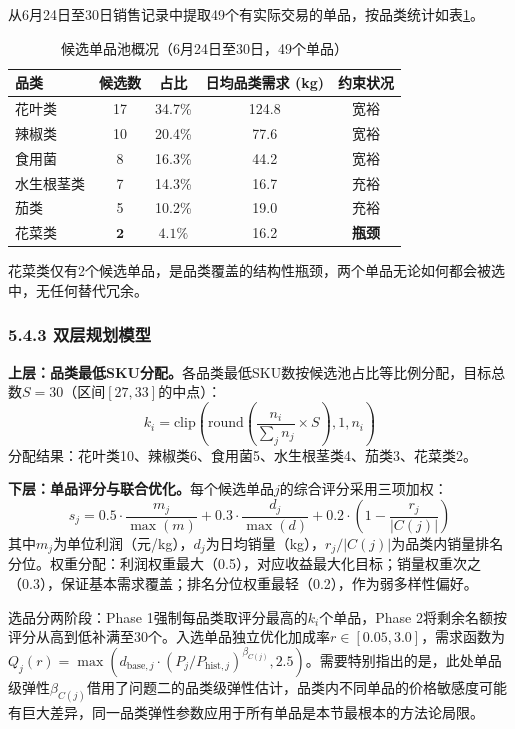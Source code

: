 \documentclass[12pt,a4paper]{article}
\begin{document}
从6月24日至30日销售记录中提取49个有实际交易的单品，按品类统计如表\ref{tab:q3_candidates}。

\begin{table}[H]
\centering
\caption{候选单品池概况（6月24日至30日，49个单品）}
\label{tab:q3_candidates}
\begin{tabular}{lcccc}
\toprule
品类 & 候选数 & 占比 & 日均品类需求 (kg) & 约束状况 \\
\midrule
花叶类 & 17 & 34.7\% & 124.8 & 宽裕 \\
辣椒类 & 10 & 20.4\% & 77.6 & 宽裕 \\
食用菌 & 8 & 16.3\% & 44.2 & 宽裕 \\
水生根茎类 & 7 & 14.3\% & 16.7 & 充裕 \\
茄类 & 5 & 10.2\% & 19.0 & 充裕 \\
花菜类 & $\mathbf{2}$ & $\mathbf{4.1\%}$ & 16.2 & \textbf{瓶颈} \\
\bottomrule
\end{tabular}
\end{table}

花菜类仅有2个候选单品，是品类覆盖的结构性瓶颈，两个单品无论如何都会被选中，无任何替代冗余。

\subsubsection{5.4.3 双层规划模型}

\textbf{上层：品类最低SKU分配。}各品类最低SKU数按候选池占比等比例分配，目标总数$S=30$（区间$[27,33]$的中点）：
\begin{equation}
k_i = \text{clip}\left( \text{round}\left( \frac{n_i}{\sum_j n_j} \times S \right), 1, n_i \right)
\end{equation}
分配结果：花叶类10、辣椒类6、食用菌5、水生根茎类4、茄类3、花菜类2。

\textbf{下层：单品评分与联合优化。}每个候选单品$j$的综合评分采用三项加权：
\begin{equation}
s_j = 0.5 \cdot \frac{m_j}{\max(m)} + 0.3 \cdot \frac{d_j}{\max(d)} + 0.2 \cdot \left(1 - \frac{r_j}{|C(j)|}\right)
\end{equation}
其中$m_j$为单位利润（元/kg），$d_j$为日均销量（kg），$r_j/|C(j)|$为品类内销量排名分位。权重分配：利润权重最大（0.5），对应收益最大化目标；销量权重次之（0.3），保证基本需求覆盖；排名分位权重最轻（0.2），作为弱多样性偏好。

选品分两阶段：Phase 1强制每品类取评分最高的$k_i$个单品，Phase 2将剩余名额按评分从高到低补满至30个。入选单品独立优化加成率$r \in [0.05, 3.0]$，需求函数为$Q_j(r) = \max(d_{\text{base},j} \cdot (P_j/P_{\text{hist},j})^{\beta_{C(j)}}, 2.5)$。需要特别指出的是，此处单品级弹性$\beta_{C(j)}$借用了问题二的品类级弹性估计，品类内不同单品的价格敏感度可能有巨大差异，同一品类弹性参数应用于所有单品是本节最根本的方法论局限。
\end{document}
